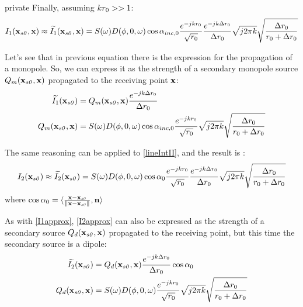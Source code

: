 \begin{shownto}{private}
Finally, assuming $kr_0 >> 1$:
\begin{equation}
I_1(\PosTheo[section], \PosTheo) \approx \widetilde{I_1}(\PosTheo[section], \PosTheo) = S(\omega) D(\azimuth, 0, \omega) \cos\normPrimaryPropAngleSection \frac{e^{-jk\distLinePrimSource}}{\sqrt{\distLinePrimSource}} \frac{e^{-jk\distLinePoint}}{\distLinePoint} \sqrt{j2\pi k} \sqrt{\frac{\distLinePoint}{\distLinePrimSource + \distLinePoint}}
\label{I1approx}
\end{equation}

Let's see that in previous equation there is the expression for the propagation of a monopole. So, we can express it as the strength of a secondary monopole source $Q_m(\PosTheo[section], \PosTheo)$ propagated to the receiving point $\PosTheo$:
\begin{equation}
\begin{aligned}
\widetilde{I_1}(\PosTheo[section]) &= Q_m(\PosTheo[section], \PosTheo) \frac{e^{-jk\distLinePoint}}{\distLinePoint} \\
Q_m(\PosTheo[section], \PosTheo) &= S(\omega) D(\azimuth, 0, \omega) \cos\normPrimaryPropAngleSection \frac{e^{-jk\distLinePrimSource}}{\sqrt{\distLinePrimSource}}\sqrt{j 2\pi k} \sqrt{\frac{\distLinePoint}{\distLinePrimSource + \distLinePoint}}
\end{aligned}
\end{equation}

The same reasoning can be applied to \autoref{lineIntII}, and the result is \cite[Equation 3.24]{Start1997}:
\begin{equation}
I_2(\PosTheo[section]) \approx \widetilde{I_2}(\PosTheo[section]) = S(\omega) D(\azimuth, 0, \omega) \cos\normSecondPropAngleSection \frac{e^{-jk\distLinePrimSource}}{\sqrt{\distLinePrimSource}} \frac{e^{-jk\distLinePoint}}{\distLinePoint} \sqrt{j2\pi k} \sqrt{\frac{\distLinePoint}{\distLinePrimSource + \distLinePoint}}
\label{I2approx}
\end{equation}
where $\cos\normSecondPropAngleSection = \langle \frac{\PosTheo - \PosTheo[section]}{\norm{\PosTheo - \PosTheo[section]}}, \vec{n} \rangle$

As with \autoref{I1approx}, \autoref{I2approx} can also be expressed as the strength of a secondary source $Q_d(\PosTheo[section], \PosTheo)$ propagated to the receiving point, but this time the secondary source is a dipole:
\begin{equation}
\begin{aligned}
\widetilde{I_2}(\PosTheo[section]) &= Q_d(\PosTheo[section], \PosTheo) \frac{e^{-jk\distLinePoint}}{\distLinePoint} \cos\normSecondPropAngleSection \\
Q_d(\PosTheo[section], \PosTheo) &= S(\omega) D(\azimuth, 0, \omega) \frac{e^{-jk\distLinePrimSource}}{\sqrt{\distLinePrimSource}} \sqrt{j2\pi k} \sqrt{\frac{\distLinePoint}{\distLinePrimSource + \distLinePoint}}
\end{aligned}
\end{equation}


\end{shownto}

